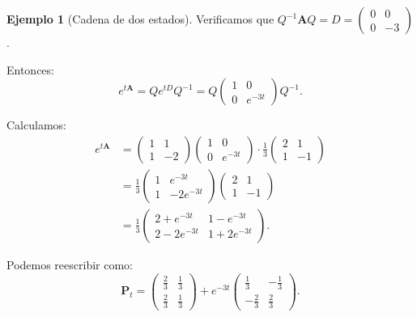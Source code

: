 \documentclass{article}
\theoremstyle{plain}
\theoremstyle{definition}
\newtheorem{Ejemplo}[Teorema]{Ejemplo}
\newcommand{\A}{\mathbf{A}}
\newcommand{\PP}{\mathbf{P}}
\begin{document}
\begin{Ejemplo}[Cadena de dos estados]
  Verificamos que $Q^{-1} \A Q = D = \begin{pmatrix} 0 & 0 \\ 0 & -3 \end{pmatrix}$.
  
  Entonces:
  \[ e^{t\A} = Q e^{tD} Q^{-1} = Q \begin{pmatrix} 1 & 0 \\ 0 & e^{-3t} \end{pmatrix} Q^{-1}. \]
  
  Calculamos:
  \begin{align*}
    e^{t\A} &= \begin{pmatrix} 1 & 1 \\ 1 & -2 \end{pmatrix} \begin{pmatrix} 1 & 0 \\ 0 & e^{-3t} \end{pmatrix} \cdot \frac{1}{3}\begin{pmatrix} 2 & 1 \\ 1 & -1 \end{pmatrix} \\
    &= \frac{1}{3} \begin{pmatrix} 1 & e^{-3t} \\ 1 & -2e^{-3t} \end{pmatrix} \begin{pmatrix} 2 & 1 \\ 1 & -1 \end{pmatrix} \\
    &= \frac{1}{3} \begin{pmatrix}
      2 + e^{-3t} & 1 - e^{-3t} \\
      2 - 2e^{-3t} & 1 + 2e^{-3t}
    \end{pmatrix}.
  \end{align*}
  
  Podemos reescribir como:
  \[ \PP_t = \begin{pmatrix} \frac{2}{3} & \frac{1}{3} \\ \frac{2}{3} & \frac{1}{3} \end{pmatrix} + e^{-3t} \begin{pmatrix} \frac{1}{3} & -\frac{1}{3} \\ -\frac{2}{3} & \frac{2}{3} \end{pmatrix}. \]
  

\end{Ejemplo}
\end{document}
